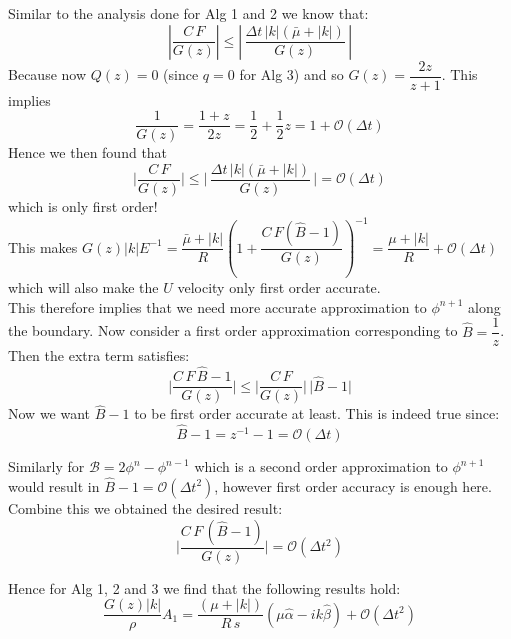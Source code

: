 Similar to the analysis done for Alg 1 and 2 we know that:
\begin{equation*}
\left|\dfrac{C\,F}{G(z)}\right| \leqslant \left|\,\dfrac{\Delta t \,|k|(\bar{\mu}+|k|)}{G(z)}\,\right|
\end{equation*}
Because now $Q(z) = 0$ (since $q=0$ for Alg 3) and so $G(z) = \dfrac{2z}{z+1}$. This implies 
\begin{equation*}
\dfrac{1}{G(z)} = \dfrac{1+z}{2z} = \dfrac{1}{2} + \dfrac{1}{2}z = 1 + \mathcal{O}(\Delta t)
\end{equation*} 
Hence we then found that
\begin{equation}
\Biggl|\dfrac{C\,F}{G(z)}\Biggr| \leqslant \Biggl|\,\dfrac{\Delta t \,|k|(\bar{\mu}+|k|)}{G(z)}\,\Biggr| = \mathcal{O}(\Delta t)
\end{equation}
which is only first order!\\
This makes $G(z) |k|E^{-1} = \dfrac{\bar{\mu} + |k|}{R}(1 + \dfrac{C \, F(\hat{B} - 1)}{G(z)})^{-1} = \dfrac{\mu + |k|}{R} +\mathcal{O}(\Delta t)$ which will also make the $U$ velocity only first order accurate.\\

This therefore implies that we need more accurate approximation to $\phi^{n+1}$ along the boundary. Now consider a first order approximation corresponding to $\hat{B}=\dfrac{1}{z}$.\\

Then the extra term satisfies:
\begin{equation*}
\Biggl|\dfrac{C\,F\,\hat{B}-1}{G(z)}\Biggr| \leqslant \Biggl|\dfrac{C\,F}{G(z)}|\,|\hat{B}-1\Biggr|
\end{equation*}
Now we want $\hat{B}-1$ to be first order accurate at least. This is indeed true since:
\begin{equation}
\hat{B} - 1 = z^{-1} - 1 = \mathcal{O}(\Delta t)
\end{equation}

Similarly for $\mathcal{B} = 2 \phi^n - \phi^{n-1}$ which is a second order approximation to $\phi^{n+1}$ would result in $\hat{B} - 1 = \mathcal{O} (\Delta t^2)$, however first order accuracy is enough here.\\

Combine this we obtained the desired result:
\begin{equation}
\Biggl|\dfrac{C\,F\,(\hat{B}-1)}{G(z)}\Biggr| = \mathcal{O}(\Delta t^2)
\end{equation}

Hence for Alg 1, 2 and 3 we find that the following results hold:
\begin{equation}
\dfrac{G(z) |k|}{\rho} A_1 = \dfrac{(\mu + |k|)}{R \, s} (\mu \hat{\alpha} - ik \hat{\beta}) + \mathcal{O} (\Delta t^2)
\end{equation}\\

